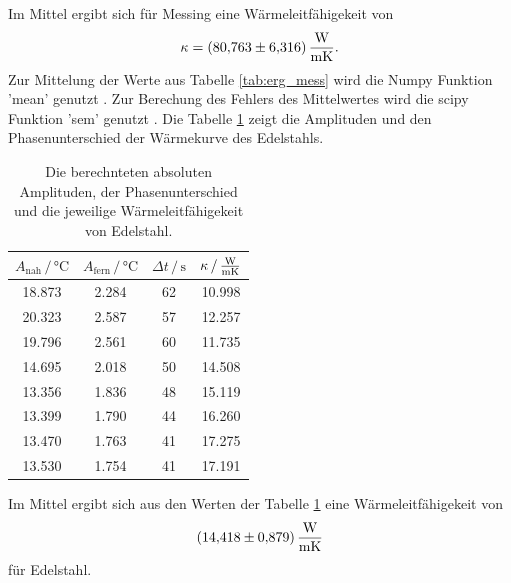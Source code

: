Im Mittel ergibt sich für Messing eine Wärmeleitfähigekeit von 
\begin{equation*}
    \kappa = \SI{80.763(6316)}{\frac{\watt}{\meter\kelvin}} .
\end{equation*}
Zur Mittelung der Werte aus Tabelle \ref{tab:erg_mess} wird die Numpy Funktion 'mean' genutzt \cite{numpy}.
Zur Berechung des Fehlers des Mittelwertes wird die scipy Funktion 'sem' genutzt \cite{scipy}.
Die Tabelle \ref{tab:erg_edel} zeigt die Amplituden und den Phasenunterschied der Wärmekurve des Edelstahls.
\begin{table}
\centering
\caption{Die berechnteten absoluten Amplituden, der Phasenunterschied und die jeweilige Wärmeleitfähigekeit von Edelstahl.}
\begin{tabular}{cccc}
    \toprule
    $A_\text{nah} \,/\, \si{\celsius}$ & $A_\text{fern} \,/\, \si{\celsius}$ & $\Delta t \,/\, \si{\second}$ & $\kappa \, / \, \si{\frac{\watt}{\meter\kelvin}}$ \\
    \midrule
    18.873 & 2.284 & 62 & 10.998 \\
    20.323 & 2.587 & 57 & 12.257 \\
    19.796 & 2.561 & 60 & 11.735 \\
    14.695 & 2.018 & 50 & 14.508 \\
    13.356 & 1.836 & 48 & 15.119 \\
    13.399 & 1.790 & 44 & 16.260 \\
    13.470 & 1.763 & 41 & 17.275 \\
    13.530 & 1.754 & 41 & 17.191 \\
    \bottomrule
\end{tabular}
\label{tab:erg_edel}
\end{table}

Im Mittel ergibt sich aus den Werten der Tabelle \ref{tab:erg_edel} eine Wärmeleitfähigekeit von
\begin{equation*}
    \SI{14.418(879)}{\frac{\watt}{\meter\kelvin}}
\end{equation*} 
für Edelstahl.

